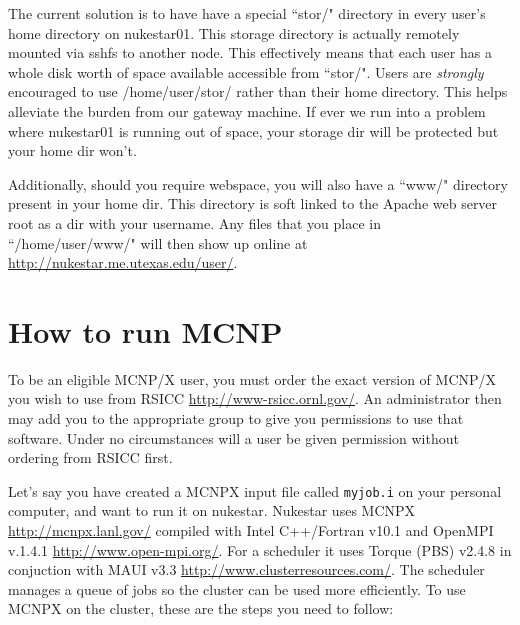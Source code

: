 \documentclass[a4paper, 12pt]{article}
\begin{document}
The current solution is to have have a special ``stor/" directory in every user's home directory on nukestar01.
This storage directory is actually remotely mounted via sshfs to another node.  This effectively means that 
each user has a whole disk worth of space available accessible from ``stor/".  
Users are \emph{strongly} encouraged to use /home/user/stor/ rather than their home directory.  
This helps alleviate the burden from our gateway machine.
If ever we run into a problem where nukestar01 is running out of space, your storage dir will be protected but your
home dir won't.

Additionally, should you require webspace, you will also have a ``www/" directory present in your home dir.
This directory is soft linked to the Apache web server root as a dir with your username.  Any files that you 
place in ``/home/user/www/" will then show up online at \url{http://nukestar.me.utexas.edu/user/}.

\section{How to run MCNP}

To be an eligible MCNP/X user, you must order the exact version of MCNP/X you wish to use from RSICC \url{http://www-rsicc.ornl.gov/}. An administrator then may add you to the appropriate group to give you permissions to use that software. Under no circumstances will a user be given permission without ordering from RSICC first.

Let's say you have created a MCNPX input file called \verb+myjob.i+ on your personal computer, and want to run it on nukestar. Nukestar uses MCNPX \url{http://mcnpx.lanl.gov/} compiled with Intel C++/Fortran v10.1 and OpenMPI v.1.4.1 \url{http://www.open-mpi.org/}. For a scheduler it uses Torque (PBS) v2.4.8 in conjuction with MAUI v3.3 \url{http://www.clusterresources.com/}. The scheduler manages a queue of jobs so the cluster can be used more efficiently. To use MCNPX on the cluster, these are the steps you need to follow:
\end{document}
